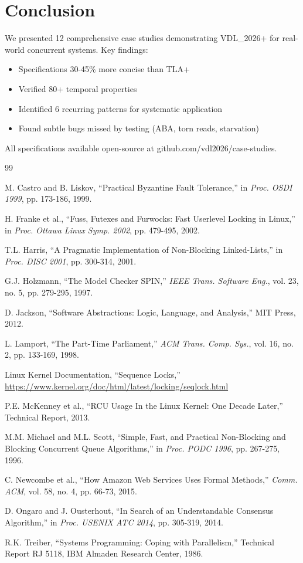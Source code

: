 \documentclass[conference]{IEEEtran}
\begin{document}
\section{Conclusion}

We presented 12 comprehensive case studies demonstrating VDL\_2026+ for real-world concurrent systems. Key findings:
\begin{itemize}
\item Specifications 30-45\% more concise than TLA+
\item Verified 80+ temporal properties
\item Identified 6 recurring patterns for systematic application
\item Found subtle bugs missed by testing (ABA, torn reads, starvation)
\end{itemize}

All specifications available open-source at github.com/vdl2026/case-studies.

\begin{thebibliography}{99}

M. Castro and B. Liskov, ``Practical Byzantine Fault Tolerance,'' in \textit{Proc. OSDI 1999}, pp. 173-186, 1999.

H. Franke et al., ``Fuss, Futexes and Furwocks: Fast Userlevel Locking in Linux,'' in \textit{Proc. Ottawa Linux Symp. 2002}, pp. 479-495, 2002.

T.L. Harris, ``A Pragmatic Implementation of Non-Blocking Linked-Lists,'' in \textit{Proc. DISC 2001}, pp. 300-314, 2001.

G.J. Holzmann, ``The Model Checker SPIN,'' \textit{IEEE Trans. Software Eng.}, vol. 23, no. 5, pp. 279-295, 1997.

D. Jackson, ``Software Abstractions: Logic, Language, and Analysis,'' MIT Press, 2012.

L. Lamport, ``The Part-Time Parliament,'' \textit{ACM Trans. Comp. Sys.}, vol. 16, no. 2, pp. 133-169, 1998.

Linux Kernel Documentation, ``Sequence Locks,'' \url{https://www.kernel.org/doc/html/latest/locking/seqlock.html}

P.E. McKenney et al., ``RCU Usage In the Linux Kernel: One Decade Later,'' Technical Report, 2013.

M.M. Michael and M.L. Scott, ``Simple, Fast, and Practical Non-Blocking and Blocking Concurrent Queue Algorithms,'' in \textit{Proc. PODC 1996}, pp. 267-275, 1996.

C. Newcombe et al., ``How Amazon Web Services Uses Formal Methods,'' \textit{Comm. ACM}, vol. 58, no. 4, pp. 66-73, 2015.

D. Ongaro and J. Ousterhout, ``In Search of an Understandable Consensus Algorithm,'' in \textit{Proc. USENIX ATC 2014}, pp. 305-319, 2014.

R.K. Treiber, ``Systems Programming: Coping with Parallelism,'' Technical Report RJ 5118, IBM Almaden Research Center, 1986.

\end{thebibliography}
\end{document}
